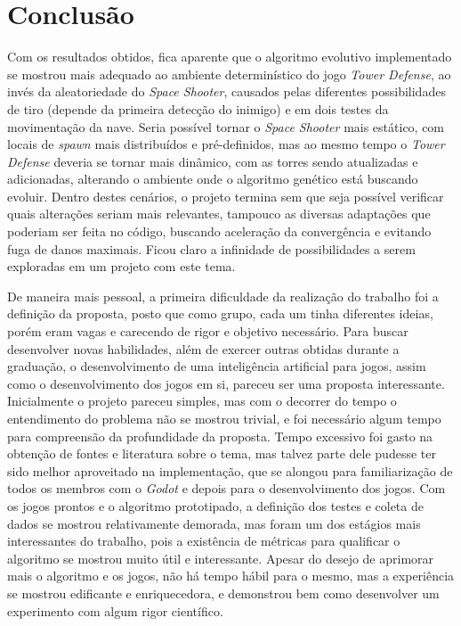 \section{Conclusão}
\label{sec:conclusao}

Com os resultados obtidos, fica aparente que o algoritmo evolutivo implementado se mostrou mais adequado ao ambiente determinístico do jogo \textit{Tower Defense}, ao invés da aleatoriedade do \textit{Space Shooter}, causados pelas diferentes possibilidades de tiro (depende da primeira detecção do inimigo) e em dois testes da movimentação da nave. Seria possível tornar o \textit{Space Shooter} mais estático, com locais de \textit{spawn} mais distribuídos e pré-definidos, mas ao mesmo tempo o \textit{Tower Defense} deveria se tornar mais dinâmico, com as torres sendo atualizadas e adicionadas, alterando o ambiente onde o algoritmo genético está buscando evoluir. Dentro destes cenários, o projeto termina sem que seja possível verificar quais alterações seriam mais relevantes, tampouco as diversas adaptações que poderiam ser feita no código, buscando aceleração da convergência e evitando fuga de danos maximais. Ficou claro a infinidade de possibilidades a serem exploradas em um projeto com este tema.

De maneira mais pessoal, a primeira dificuldade da realização do trabalho foi a definição da proposta, posto que como grupo, cada um tinha diferentes ideias, porém eram vagas e carecendo de rigor e objetivo necessário. Para buscar desenvolver novas habilidades, além de exercer outras obtidas durante a graduação, o desenvolvimento de uma inteligência artificial para jogos, assim como o desenvolvimento dos jogos em si, pareceu ser uma proposta interessante. Inicialmente o projeto pareceu simples, mas com o decorrer do tempo o entendimento do problema não se mostrou trivial, e foi necessário algum tempo para compreensão da profundidade da proposta. Tempo excessivo foi gasto na obtenção de fontes e literatura sobre o tema, mas talvez parte dele pudesse ter sido melhor aproveitado na implementação, que se alongou para familiarização de todos os membros com o \textit{Godot} e depois para o desenvolvimento dos jogos. Com os jogos prontos e o algoritmo prototipado, a definição dos testes e coleta de dados se mostrou relativamente demorada, mas foram um dos estágios mais interessantes do trabalho, pois a existência de métricas para qualificar o algoritmo se mostrou muito útil e interessante. Apesar do desejo de aprimorar mais o algoritmo e os jogos, não há tempo hábil para o mesmo, mas a experiência se mostrou edificante e enriquecedora, e demonstrou bem como desenvolver um experimento com algum rigor científico.
